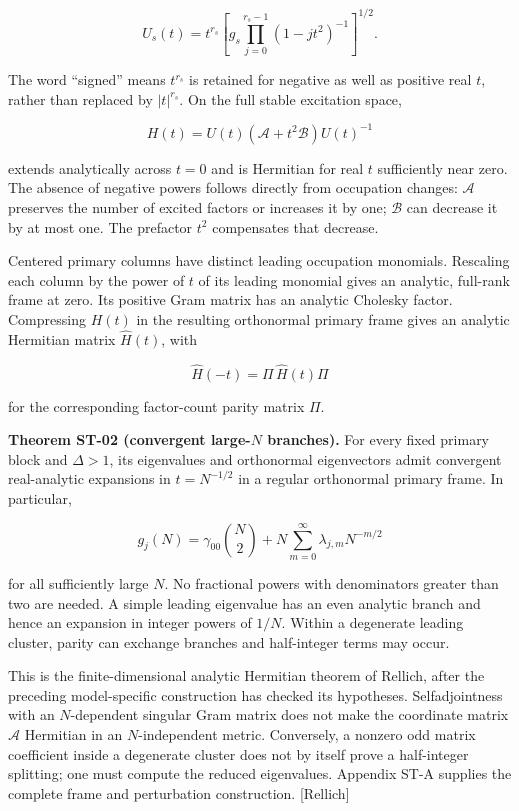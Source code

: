 \documentclass[a4paper,11pt]{article}
\numberwithin{equation}{section}
\begin{document}
\[
U_s(t)=t^{r_s}
\left[g_s\prod_{j=0}^{r_s-1}(1-jt^2)^{-1}\right]^{1/2}.
\]

The word ``signed'' means \(t^{r_s}\) is retained for negative as well as positive real \(t\), rather than replaced by \(|t|^{r_s}\). On the full stable excitation space,

\[
H(t)=U(t)(\mathscr A+t^2\mathscr B)U(t)^{-1}
\]

extends analytically across \(t=0\) and is Hermitian for real \(t\) sufficiently near zero. The absence of negative powers follows directly from occupation changes: \(\mathscr A\) preserves the number of excited factors or increases it by one; \(\mathscr B\) can decrease it by at most one. The prefactor \(t^2\) compensates that decrease.

Centered primary columns have distinct leading occupation monomials. Rescaling each column by the power of \(t\) of its leading monomial gives an analytic, full-rank frame at zero. Its positive Gram matrix has an analytic Cholesky factor. Compressing \(H(t)\) in the resulting orthonormal primary frame gives an analytic Hermitian matrix \(\widehat H(t)\), with

\[
\widehat H(-t)=\Pi\,\widehat H(t)\Pi
\]

for the corresponding factor-count parity matrix \(\Pi\).

\textbf{Theorem ST-02 (convergent large-\(N\) branches).} For every fixed primary block and \(\Delta>1\), its eigenvalues and orthonormal eigenvectors admit convergent real-analytic expansions in \(t=N^{-1/2}\) in a regular orthonormal primary frame. In particular,

\[
g_j(N)=\gamma_{00}\binom N2+
N\sum_{m=0}^{\infty}\lambda_{j,m}N^{-m/2}
\]

for all sufficiently large \(N\). No fractional powers with denominators greater than two are needed. A simple leading eigenvalue has an even analytic branch and hence an expansion in integer powers of \(1/N\). Within a degenerate leading cluster, parity can exchange branches and half-integer terms may occur.

This is the finite-dimensional analytic Hermitian theorem of Rellich, after the preceding model-specific construction has checked its hypotheses. Selfadjointness with an \(N\)-dependent singular Gram matrix does not make the coordinate matrix \(\mathscr A\) Hermitian in an \(N\)-independent metric. Conversely, a nonzero odd matrix coefficient inside a degenerate cluster does not by itself prove a half-integer splitting; one must compute the reduced eigenvalues. Appendix ST-A supplies the complete frame and perturbation construction. {[}Rellich{]}
\end{document}
